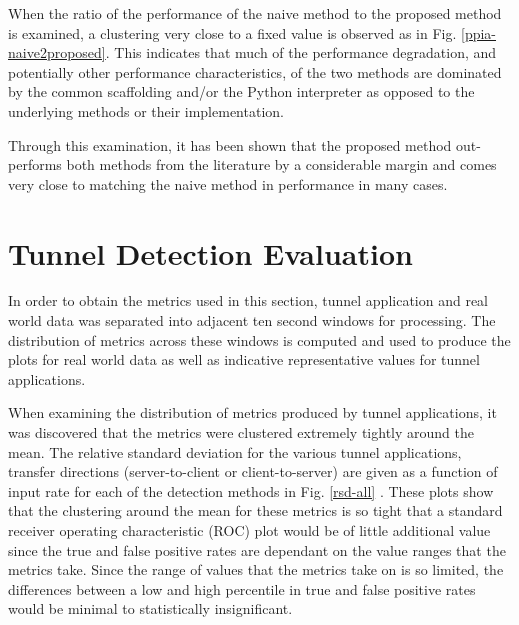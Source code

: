 \documentclass{llncs}
\begin{document}
When the ratio of the performance of the naive method to the proposed method is
examined, a clustering very close to a fixed value is observed as in Fig.
\ref{ppia-naive2proposed}. This indicates that much of the performance
degradation, and potentially other performance characteristics, of the two
methods are dominated by the common scaffolding and/or the Python interpreter as
opposed to the underlying methods or their implementation.

Through this examination, it has been shown that the proposed method
out-performs both methods from the literature by a considerable margin and comes
very close to matching the naive method in performance in many cases.

\section{Tunnel Detection Evaluation}
\label{chap-evaluation}
\label{tunnel-detection-performance}

In order to obtain the metrics used in this section, tunnel application and real
world data was separated into adjacent ten second windows for processing. The
distribution of metrics across these windows is computed and used to produce the
plots for real world data as well as indicative representative values for tunnel
applications.

When examining the distribution of metrics produced by tunnel applications, it
was discovered that the metrics were clustered extremely tightly around the
mean. The relative standard deviation for the various tunnel applications,
transfer directions (server-to-client or client-to-server) are given as a
function of input rate for each of the detection methods in
Fig. \ref{rsd-all}
. These
plots show that the clustering around the mean for these metrics is so tight
that a standard receiver operating characteristic (ROC) plot would be of little
additional value since the true and false positive rates are dependant on the
value ranges that the metrics take. Since the range of values that the metrics
take on is so limited, the differences between a low and high percentile in true
and false positive rates would be minimal to statistically insignificant.
\end{document}
